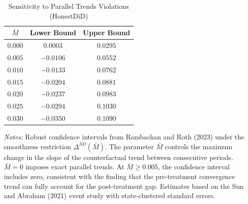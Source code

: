 \begin{table}[htbp]
\centering
\caption{Sensitivity to Parallel Trends Violations (HonestDiD)}
\label{tab:honest}
\begin{tabular}{ccc}
\hline\hline
$\bar{M}$ & Lower Bound & Upper Bound \\
\hline
$0.000$ & $0.0003$ & $0.0295$ \\
$0.005$ & $-0.0106$ & $0.0552$ \\
$0.010$ & $-0.0133$ & $0.0762$ \\
$0.015$ & $-0.0204$ & $0.0881$ \\
$0.020$ & $-0.0237$ & $0.0983$ \\
$0.025$ & $-0.0294$ & $0.1030$ \\
$0.030$ & $-0.0350$ & $0.1090$ \\
\hline\hline
\end{tabular}
\begin{tablenotes}
\small
\item \textit{Notes:} Robust confidence intervals from Rambachan and Roth (2023) under the smoothness restriction $\Delta^{SD}(\bar{M})$. The parameter $\bar{M}$ controls the maximum change in the slope of the counterfactual trend between consecutive periods. $\bar{M} = 0$ imposes exact parallel trends. At $\bar{M} \geq 0.005$, the confidence interval includes zero, consistent with the finding that the pre-treatment convergence trend can fully account for the post-treatment gap. Estimates based on the Sun and Abraham (2021) event study with state-clustered standard errors.
\end{tablenotes}
\end{table}
